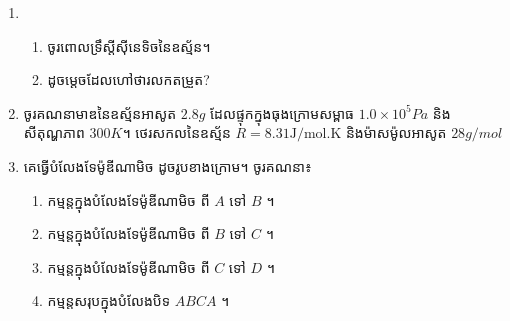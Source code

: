 \documentclass{officialexam}
\begin{document}
	{\maketitle}
	\borderline{[ប្រធានទី០១]}
	\begin{enumerate}[I]
		\item \begin{enumerate}[k]
			\item ចូរពោលទ្រឹស្ដីស៊ីនេទិចនៃឧស័្មន។
			\item ដូចម្ដេចដែលហៅថារលកតម្រួត?
		\end{enumerate}
		\item ចូរគណនាមាឌនៃឧស្ម័នអាសូត $2.8g$ ដែលផ្ទុកក្នុងធុងក្រោមសម្ពាធ $1.0\times10^5Pa$ និងសីតុណ្ហភាព $300K$។ ថេរសកលនៃឧស្ម័ន $R=8.31\mathrm{J/mol.K}$ និងម៉ាសម៉ូលអាសូត $28g/mol$
		\item គេធ្វើបំលែងទែម៉ូឌីណាមិច ដូចរូបខាងក្រោម។ ចូរគណនា៖
		\begin{enumerate}[k]
			\item កម្មន្តក្នុងបំលែងទែម៉ូឌីណាមិច ពី $A$ ទៅ $B$ ។
			\item កម្មន្តក្នុងបំលែងទែម៉ូឌីណាមិច ពី $B$ ទៅ $C$ ។
			\item កម្មន្តក្នុងបំលែងទែម៉ូឌីណាមិច ពី $C$ ទៅ $D$ ។
			\item កម្មន្តសរុបក្នុងបំលែងបិទ $ABCA$ ។
		\end{enumerate}
	\end{enumerate}
\end{document}
